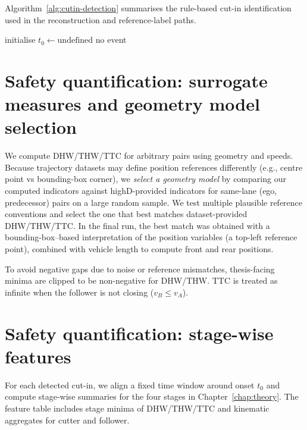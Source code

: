 \documentclass[12pt,a4paper,twoside,openright]{report}
\begin{document}
    Algorithm~\ref{alg:cutin-detection} summarises the rule-based cut-in identification used in the reconstruction and reference-label paths.

    \begin{algorithm}[t]
\caption{Cut-in identification as a cutter--follower pair}
\label{alg:cutin-detection}

initialise $t_0 \leftarrow \text{undefined}$\;
\Return no event\;
    \end{algorithm}

    \section{Safety quantification: surrogate measures and geometry model selection}
    We compute DHW/THW/TTC for arbitrary pairs using geometry and speeds. Because trajectory datasets may define position references differently (e.g., centre point vs bounding-box corner), we \emph{select a geometry model} by comparing our computed indicators against highD-provided indicators for same-lane (ego, predecessor) pairs on a large random sample. We test multiple plausible reference conventions and select the one that best matches dataset-provided DHW/THW/TTC. In the final run, the best match was obtained with a bounding-box--based interpretation of the position variables (a top-left reference point), combined with vehicle length to compute front and rear positions.

    To avoid negative gaps due to noise or reference mismatches, thesis-facing minima are clipped to be non-negative for DHW/THW. TTC is treated as infinite when the follower is not closing ($v_B \leq v_A$).

    \section{Safety quantification: stage-wise features}
    For each detected cut-in, we align a fixed time window around onset $t_0$ and compute stage-wise summaries for the four stages in Chapter~\ref{chap:theory}. The feature table includes stage minima of DHW/THW/TTC and kinematic aggregates for cutter and follower.
\end{document}
